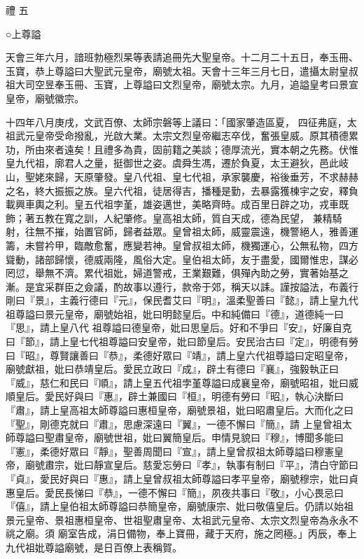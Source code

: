 
\begin{pinyinscope}

 禮
 五



 ○上尊謚



 天會三年六月，諳班勃極烈杲等表請追冊先大聖皇帝。十二月二十五日，奉玉冊、玉寶，恭上尊謚曰大聖武元皇帝，廟號太祖。天會十三年三月七日，遣攝太尉皇叔祖大司空昱奉玉冊、玉寶，上尊謚曰文烈皇帝，廟號太宗。九月，追謚皇考曰景宣皇帝，廟號徽宗。



 十四年八月庚戌，文武百僚、太師宗磐等上議曰：「國家肇造區夏，
 四征弗庭，太祖武元皇帝受命撥亂，光啟大業。太宗文烈皇帝繼志卒伐，奮張皇威。原其積德累功，所由來者遠矣！且禮多為貴，固前籍之美談；德厚流光，實本朝之先務。伏惟皇九代祖，廓君人之量，挺御世之姿。虞舜生馮，遷於負夏，太王避狄，邑此岐山，聖姥來歸，天原肇發。皇八代祖、皇七代祖，承家襲慶，裕後垂芳，不求赫赫之名，終大振振之族。皇六代祖，徒居得吉，播種是勤，去暴露獲棟宇之安，釋負載興車輿之利。皇五代祖孛堇，雄姿邁世，美略齊時。成百里日辟之功，戎車既飾；著五教在寬之訓，人紀肇修。皇高祖太師，質自天成，德為民望，
 兼精騎射，往無不摧，始置官師，歸者益眾。皇曾祖太師，威靈震遠，機警絕人，雅善運籌，未嘗衿甲，臨敵愈奮，應變若神。皇曾叔祖太師，機獨運心，公無私物，四方聳動，諸部歸懷，德威兩隆，風俗大定。皇伯祖太師，友于盡愛，國爾惟忠，謀必罔愆，舉無不濟。累代祖妣，婦道警戒，王業艱難，俱殫內助之勞，實著始基之漸。是宜采群臣之僉議，酌故事以遵行，款帝于郊，稱天以誄。謹按謚法，布義行剛曰『景』，主義行德曰『元』，保民耆艾曰『明』，溫柔聖善曰『懿』，請上皇九代祖尊謚曰景元皇帝，廟號始祖，妣曰明懿皇后。中和純備曰『德』，道德純一曰『思』，請上皇八代
 祖尊謚曰德皇帝，妣曰思皇后。好和不爭曰『安』，好廉自克曰『節』，請上皇七代祖尊謚曰安皇帝，妣曰節皇后。安民治古曰『定』，明德有勞曰『昭』，尊賢讓善曰『恭』，柔德好眾曰『靖』，請上皇六代祖尊謚曰定昭皇帝，廟號獻祖，妣曰恭靖皇后。愛民立政曰『成』，辟土有德曰『襄』，強毅執正曰『威』，慈仁和民曰『順』，請上皇五代祖孛堇尊謚曰成襄皇帝，廟號昭祖，妣曰威順皇后。愛民好與曰『惠』，辟土兼國曰『桓』，明德有勞曰『昭』，執心決斷曰『肅』，請上皇高祖太師尊謚曰惠桓皇帝，廟號景祖，妣曰昭肅皇后。大而化之曰『聖』，剛德克就曰『肅』，思慮深遠曰『翼』，一德不懈曰『簡』，請
 上皇曾祖太師尊謚曰聖肅皇帝，廟號世祖，妣曰翼簡皇后。申情見貌曰『穆』，博聞多能曰『憲』，柔德好眾曰『靜』，聖善周聞曰『宣』，請上皇曾叔祖太師尊謚曰穆憲皇帝，廟號肅宗，妣曰靜宣皇后。慈愛忘勞曰『孝』，執事有制曰『平』，清白守節曰『貞』，愛民好與曰『惠』，請上皇曾叔祖太師尊謚曰孝平皇帝，廟號穆宗，妣曰貞惠皇后。愛民長悌曰『恭』，一德不懈曰『簡』，夙夜共事曰『敬』，小心畏忌曰『僖』，請上皇伯祖太師尊謚曰恭簡皇帝，廟號康宗、妣曰敬僖皇后。仍請以始祖景元皇帝、景祖惠桓皇帝、世祖聖肅皇帝、太祖武元皇帝、太宗文烈皇帝為永永不祧之廟。須
 廟室告成，涓日備物，奉上寶冊，藏于天府，施之罔極。」丙辰，奉上九代祖妣尊謚廟號，是日百僚上表稱賀。




\end{pinyinscope}
